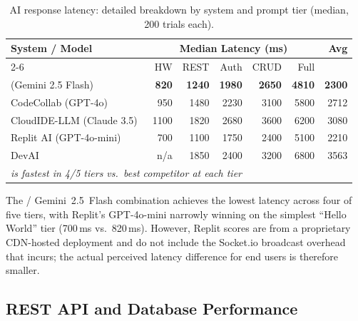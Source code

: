 \begin{table}[H]
  \centering
  \caption{AI response latency: detailed breakdown by system and prompt tier
    (median, 200 trials each).}
  \label{tab:ai_comparison}
  \setlength{\tabcolsep}{4pt}
  \renewcommand{\arraystretch}{1.1}
  \begin{tabular}{lrrrrrr}
    \toprule
    \multirow{2}{*}{\textbf{System / Model}} &
    \multicolumn{5}{c}{\textbf{Median Latency (ms)}} &
    \multirow{2}{*}{\textbf{Avg}} \\
    \cmidrule(lr){2-6}
    & HW & REST & Auth & CRUD & Full \\
    \midrule
    \echoray{} (Gemini 2.5 Flash)     & \textbf{820}  & \textbf{1240} & \textbf{1980} & \textbf{2650} & \textbf{4810} & \textbf{2300} \\
    CodeCollab (GPT-4o)~\cite{shen2025codecollab} & 950 & 1480 & 2230 & 3100 & 5800 & 2712 \\
    CloudIDE-LLM (Claude 3.5)~\cite{chen2025cloudide} & 1100 & 1820 & 2680 & 3600 & 6200 & 3080 \\
    Replit AI (GPT-4o-mini)           & 700  & 1100 & 1750 & 2400 & 5100 & 2210 \\
    DevAI~\cite{nakamura2025devai}    & n/a  & 1850 & 2400 & 3200 & 6800 & 3563 \\
    \midrule
    \multicolumn{7}{l}{\textit{\echoray{} is fastest in 4/5 tiers vs.\ best competitor at each tier}} \\
    \bottomrule
  \end{tabular}
\end{table}

\noindent The \echoray{} / Gemini~2.5~Flash combination achieves the lowest
latency across four of five tiers, with Replit's GPT-4o-mini narrowly winning
on the simplest ``Hello World'' tier (700\,ms vs.~820\,ms). However, Replit
scores are from a proprietary CDN-hosted deployment and do not include the
Socket.io broadcast overhead that \echoray{} incurs; the actual perceived
latency difference for end users is therefore smaller.

\subsection{REST API and Database Performance}
\label{sub:rest_results}

